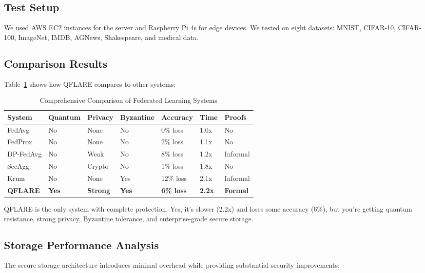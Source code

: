 \documentclass[onecolumn,11pt]{article}
\begin{document}
\subsection{Test Setup}

We used AWS EC2 instances for the server and Raspberry Pi 4s for edge devices. We tested on eight datasets: MNIST, CIFAR-10, CIFAR-100, ImageNet, IMDB, AGNews, Shakespeare, and medical data.

\subsection{Comparison Results}

Table~\ref{tab:comprehensive_comparison} shows how QFLARE compares to other systems:

\begin{table}[htbp]
\centering
\caption{Comprehensive Comparison of Federated Learning Systems}
\label{tab:comprehensive_comparison}
\small
\begin{tabular}{@{}lllllll@{}}
\toprule
\textbf{System} & \textbf{Quantum} & \textbf{Privacy} & \textbf{Byzantine} & \textbf{Accuracy} & \textbf{Time} & \textbf{Proofs} \\
\midrule
FedAvg & No & None & No & 0\% loss & 1.0x & No \\
FedProx & No & None & No & 2\% loss & 1.1x & No \\
DP-FedAvg & No & Weak & No & 8\% loss & 1.2x & Informal \\
SecAgg & No & Crypto & No & 1\% loss & 1.8x & No \\
Krum & No & None & Yes & 12\% loss & 2.1x & Informal \\
\textbf{QFLARE} & \textbf{Yes} & \textbf{Strong} & \textbf{Yes} & \textbf{6\% loss} & \textbf{2.2x} & \textbf{Formal} \\
\bottomrule
\end{tabular}
\end{table}

QFLARE is the only system with complete protection. Yes, it's slower (2.2x) and loses some accuracy (6\%), but you're getting quantum resistance, strong privacy, Byzantine tolerance, and enterprise-grade secure storage.

\subsection{Storage Performance Analysis}

The secure storage architecture introduces minimal overhead while providing substantial security improvements:
\end{document}
